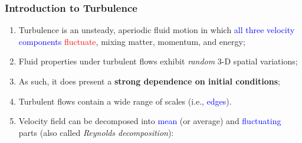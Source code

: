 \documentclass[10pt,compress,handout,ignorenonframetext]{beamer}
\newcommand{\red}{\textcolor{red}}
\newcommand{\blue}{\textcolor{blue}}
\begin{document}
\begin{frame}
 \frametitle{Introduction to Turbulence}
   \begin{enumerate}
      \item<1-> Turbulence is an unsteady, aperiodic fluid motion in which \blue{all three velocity components} \red{fluctuate}, mixing matter, momentum, and energy;
      \item<1-> Fluid properties under turbulent flows exhibit {\it random} 3-D spatial variations;
      \item<1-> As such, it does present a {\bf strong dependence on initial conditions};
      \item<1-> Turbulent flows contain a wide range of scales (i.e., \blue{edges}).
      \item<2-> Velocity field can be decomposed into \blue{mean} (or average) and \blue{fluctuating} parts (also called {\it Reynolds decomposition}):
   \end{enumerate}
\end{frame}
\end{document}

